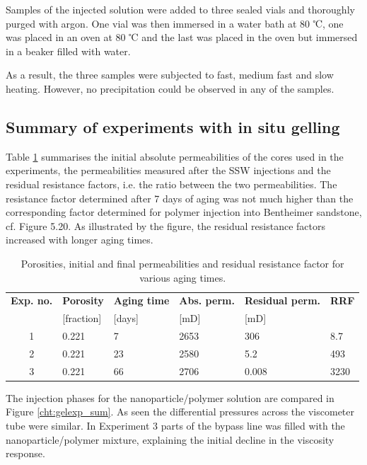 Samples of the injected solution were added to three sealed vials and thoroughly purged with argon. One vial was then immersed in a water bath at 80 ℃, one was placed in an oven at 80 ℃ and the last was placed in the oven but immersed in a beaker filled with water.

As a result, the three samples were subjected to fast, medium fast and slow heating. However, no precipitation could be observed in any of the samples.

\FloatBarrier
\subsection{Summary of experiments with in situ gelling}
Table \ref{tab:porPermAge} summarises the initial absolute permeabilities of the cores used in the experiments, the permeabilities measured after the SSW injections and the residual resistance factors, i.e. the ratio between the two permeabilities. The resistance factor determined after 7 days of aging was not much higher than the corresponding factor determined for polymer injection into Bentheimer sandstone, cf. Figure 5.20. As illustrated by the figure, the residual resistance factors increased with longer aging times.
\begin{table}
\small
\centering
\caption{Porosities, initial and final permeabilities and residual resistance factor for various aging times.}
\label{tab:porPermAge} %
\begin{tabular}{c l l l l l } 
\toprule
\textbf{Exp. no.} & \textbf{Porosity} & \textbf{Aging time} & \textbf{Abs. perm.} & \textbf{Residual perm.} & \textbf{RRF} \\ 
 & [fraction] & [days] & [mD] & [mD] & \\
\midrule 
1  & 0.221   &  7     & 2653     & 306      & 8.7    \\
2  & 0.221   & 23     & 2580     & 5.2      & 493      \\ 
3  & 0.221   & 66     & 2706     & 0.008    & 3230   \\ 
\bottomrule
\end{tabular}
\end{table}

The injection phases for the nanoparticle/polymer solution are compared in Figure \ref{cht:gelexp_sum}. As seen the differential pressures across the viscometer tube were similar. In Experiment 3 parts of the bypass line was filled with the nanoparticle/polymer mixture, explaining the initial decline in the viscosity response. 


